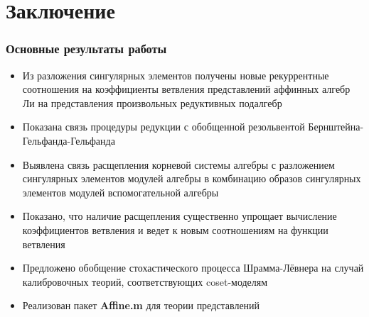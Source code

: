 \documentclass[pdftex]{beamer}
\theoremstyle{definition} \newtheorem{Def}{Определение}
\begin{document}
\section{Заключение}


\begin{frame}
  \frametitle{Основные результаты работы}
\begin{itemize}
\item Из разложения сингулярных элементов получены новые рекуррентные соотношения на коэффициенты ветвления представлений аффинных алгебр Ли на представления произвольных редуктивных подалгебр
\item Показана связь процедуры редукции с обобщенной резольвентой Бернштейна-Гельфанда-Гельфанда
\item Выявлена связь расщепления корневой системы алгебры с разложением сингулярных элементов модулей алгебры в комбинацию образов сингулярных элементов  модулей вспомогательной алгебры
\item Показано, что наличие расщепления существенно упрощает вычисление коэффициентов ветвления и ведет к новым соотношениям на функции ветвления
\item Предложено обобщение стохастического процесса Шрамма-Лёвнера на случай калибровочных теорий, соответствующих coset-моделям
\item Реализован пакет {\bf Affine.m} для теории представлений
\end{itemize}

\end{frame}
\end{document}
